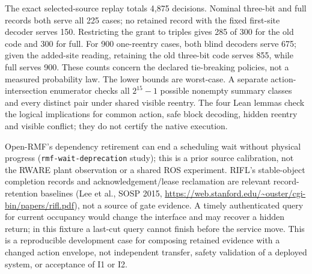 \documentclass{article}
\begin{document}
The exact selected-source replay totals 4,875 decisions. Nominal three-bit and full records both serve all 225 cases; no retained record with the fixed first-site decoder serves 150. Restricting the grant to triples gives 285 of 300 for the old code and 300 for full. For 900 one-reentry cases, both blind decoders serve 675; given the added-site reading, retaining the old three-bit code serves 855, while full serves 900. These counts concern the declared tie-breaking policies, not a measured probability law. The lower bounds are worst-case. A separate action-intersection enumerator checks all \(2^{15}-1\) possible nonempty summary classes and every distinct pair under shared visible reentry. The four Lean lemmas check the logical implications for common action, safe block decoding, hidden reentry and visible conflict; they do not certify the native execution.

Open-RMF's dependency retirement can end a scheduling wait without physical progress (\texttt{rmf-wait-deprecation} study); this is a prior source calibration, not the RWARE plant observation or a shared ROS experiment. RIFL's stable-object completion records and acknowledgement/lease reclamation are relevant record-retention baselines (Lee et al., SOSP 2015, \url{https://web.stanford.edu/~ouster/cgi-bin/papers/rifl.pdf}), not a source of gate evidence. A timely authenticated query for current occupancy would change the interface and may recover a hidden return; in this fixture a last-cut query cannot finish before the service move. This is a reproducible development case for composing retained evidence with a changed action envelope, not independent transfer, safety validation of a deployed system, or acceptance of I1 or I2.
\end{document}
